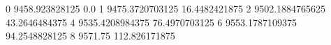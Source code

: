 0 9458.923828125 0.0
1 9475.3720703125 16.4482421875
2 9502.1884765625 43.2646484375
4 9535.4208984375 76.4970703125
6 9553.1787109375 94.2548828125
8 9571.75 112.826171875
